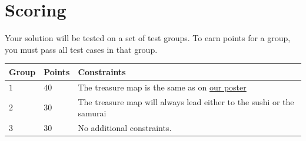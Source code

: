 \section*{Scoring}
Your solution will be tested on a set of test groups.
To earn points for a group, you must pass all test cases in that group.

\noindent
\begin{tabular}{| l | l | p{12cm} |}
  \hline
  \textbf{Group} & \textbf{Points} & \textbf{Constraints} \\ \hline
  $1$    & $40$      & The treasure map is the same as on \href{https://www.progolymp.se/2018/affisch.pdf}{our poster} \\ \hline
  $2$    & $30$      & The treasure map will always lead either to the sushi or the samurai \\ \hline
  $3$    & $30$      & No additional constraints.  \\ \hline
\end{tabular}
